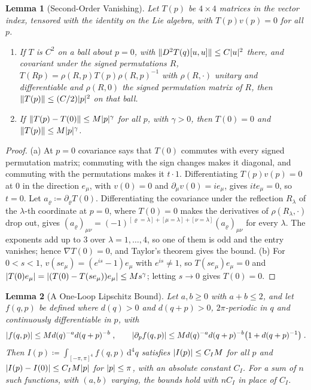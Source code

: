 \documentclass[11pt]{preprint}
\newcommand{\dd}{\mathrm{d}}
\DeclarePairedDelimiter{\abs}{\lvert}{\rvert}
\DeclarePairedDelimiter{\norm}{\lVert}{\rVert}
\numberwithin{equation}{section}
\newtheorem{lemma}{Lemma}[section]
\theoremstyle{definition}
\theoremstyle{remark}
\theoremstyle{plain}
\begin{document}
\begin{lemma}[Second-Order Vanishing]\label{lem:second-order-vanishing}
Let $T(p)$ be $4 \times 4$ matrices in the vector index, tensored with the identity on the Lie algebra, with $T(p)v(p) = 0$ for all $p$.
\begin{enumerate}[label=(\alph*)]
\item If $T$ is $C^2$ on a ball about $p = 0$, with $\norm{D^2T(q)[u, u]} \leq C\abs{u}^2$ there, and covariant under the signed permutations $R$, $T(Rp) = \rho(R, p)T(p)\rho(R, p)^{-1}$ with $\rho(R, \cdot)$ unitary and differentiable and $\rho(R, 0)$ the signed permutation matrix of $R$, then $\norm{T(p)} \leq (C/2)\abs{p}^2$ on that ball.
\item If $\norm{T(p) - T(0)} \leq M\abs{p}^\gamma$ for all $p$, with $\gamma > 0$, then $T(0) = 0$ and $\norm{T(p)} \leq M\abs{p}^\gamma$.
\end{enumerate}
\end{lemma}

\begin{proof}
(a) At $p = 0$ covariance says that $T(0)$ commutes with every signed permutation matrix; commuting with the sign changes makes it diagonal, and commuting with the permutations makes it $t\cdot 1$. Differentiating $T(p)v(p) = 0$ at $0$ in the direction $e_\mu$, with $v(0) = 0$ and $\partial_\mu v(0) = ie_\mu$, gives $ite_\mu = 0$, so $t = 0$. Let $a_\varrho \coloneqq \partial_\varrho T(0)$. Differentiating the covariance under the reflection $R_\lambda$ of the $\lambda$-th coordinate at $p = 0$, where $T(0) = 0$ makes the derivatives of $\rho(R_\lambda, \cdot)$ drop out, gives $(a_\varrho)_{\mu\nu} = (-1)^{[\varrho = \lambda] + [\mu = \lambda] + [\nu = \lambda]}(a_\varrho)_{\mu\nu}$ for every $\lambda$. The exponents add up to $3$ over $\lambda = 1, \dots, 4$, so one of them is odd and the entry vanishes; hence $\nabla T(0) = 0$, and Taylor's theorem gives the bound. (b) For $0 < s < 1$, $v(se_\mu) = (e^{is} - 1)e_\mu$ with $e^{is} \neq 1$, so $T(se_\mu)e_\mu = 0$ and $\abs{T(0)e_\mu} = \abs{(T(0) - T(se_\mu))e_\mu} \leq Ms^\gamma$; letting $s \to 0$ gives $T(0) = 0$.
\end{proof}

\begin{lemma}[A One-Loop Lipschitz Bound]\label{lem:one-loop-lipschitz}
Let $a, b \geq 0$ with $a + b \leq 2$, and let $f(q, p)$ be defined where $d(q) > 0$ and $d(q + p) > 0$, $2\pi$-periodic in $q$ and continuously differentiable in $p$, with
\begin{equation}\label{eq:lipschitz-hypotheses}
    \abs{f(q, p)} \leq Md(q)^{-a}d(q + p)^{-b}\;,
    \qquad
    \abs{\partial_pf(q, p)} \leq Md(q)^{-a}d(q + p)^{-b}\bigl(1 + d(q + p)^{-1}\bigr)\;.
\end{equation}
Then $I(p) \coloneqq \int_{[-\pi,\pi]^4}f(q, p)\,\dd^4q$ satisfies $\abs{I(p)} \leq C_IM$ for all $p$ and $\abs{I(p) - I(0)} \leq C_IM\abs{p}$ for $\abs{p} \leq \pi$, with an absolute constant $C_I$. For a sum of $n$ such functions, with $(a, b)$ varying, the bounds hold with $nC_I$ in place of $C_I$.
\end{lemma}
\end{document}
